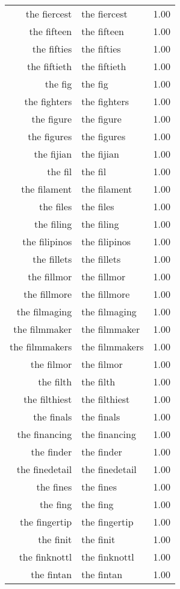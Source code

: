 \begin{table}[ht]
\begin{tabular}{rlr}
  the fiercest & the fiercest & 1.00 \\ 
  the fifteen & the fifteen & 1.00 \\ 
  the fifties & the fifties & 1.00 \\ 
  the fiftieth & the fiftieth & 1.00 \\ 
  the fig & the fig & 1.00 \\ 
  the fighters & the fighters & 1.00 \\ 
  the figure & the figure & 1.00 \\ 
  the figures & the figures & 1.00 \\ 
  the fijian & the fijian & 1.00 \\ 
  the fil & the fil & 1.00 \\ 
  the filament & the filament & 1.00 \\ 
  the files & the files & 1.00 \\ 
  the filing & the filing & 1.00 \\ 
  the filipinos & the filipinos & 1.00 \\ 
  the fillets & the fillets & 1.00 \\ 
  the fillmor & the fillmor & 1.00 \\ 
  the fillmore & the fillmore & 1.00 \\ 
  the filmaging & the filmaging & 1.00 \\ 
  the filmmaker & the filmmaker & 1.00 \\ 
  the filmmakers & the filmmakers & 1.00 \\ 
  the filmor & the filmor & 1.00 \\ 
  the filth & the filth & 1.00 \\ 
  the filthiest & the filthiest & 1.00 \\ 
  the finals & the finals & 1.00 \\ 
  the financing & the financing & 1.00 \\ 
  the finder & the finder & 1.00 \\ 
  the finedetail & the finedetail & 1.00 \\ 
  the fines & the fines & 1.00 \\ 
  the fing & the fing & 1.00 \\ 
  the fingertip & the fingertip & 1.00 \\ 
  the finit & the finit & 1.00 \\ 
  the finknottl & the finknottl & 1.00 \\ 
  the fintan & the fintan & 1.00 \\ 

\end{tabular}
\end{table}
